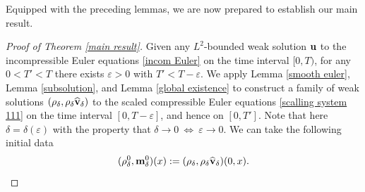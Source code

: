 \documentclass[12pt,reqno]{amsart}
\theoremstyle{definition}
\theoremstyle{remark}
\numberwithin{equation}{section}
\renewcommand{\u}{{\bf u}}
\renewcommand{\v}{{\bf v}}
\newcommand{\m}{{\bf m}}
\newcommand{\eps}{{\varepsilon}}
\begin{document}
Equipped with the preceding lemmas, we are now prepared to establish our main result. 
\begin{proof}[Proof of Theorem \ref{main result}]
Given any $L^2$-bounded weak solution $\u$ to the incompressible Euler equations \eqref{incom Euler} on the time interval $[0, T)$, for any $0 < T' < T$ there exists $\eps > 0$ with $T' < T - \eps$. We apply Lemma \ref{smooth euler}, Lemma \ref{subsolution}, and Lemma \ref{global existence} to construct a family of weak solutions $(\rho_{\delta},\rho_{\delta}\widehat{\v}_{\delta})$ to the scaled compressible Euler equations \eqref{scalling system 111} on the time interval $[0, T-\eps]$, and hence on $[0, T']$. Note that here $\delta = \delta(\eps)$ with the property that $\delta \to 0 \ \Leftrightarrow \ \eps \to 0$. 
We can take the following initial data  
$$
(\rho_{\delta}^0, \m_\delta^0)(x) := (\rho_{\delta}, \rho_{\delta}\widehat{\v}_{\delta})(0,x).
$$


\end{proof}
\end{document}
